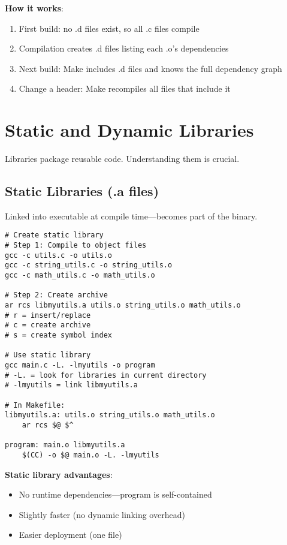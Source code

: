\textbf{How it works}:

\begin{enumerate}
    \item First build: no .d files exist, so all .c files compile
    \item Compilation creates .d files listing each .o's dependencies
    \item Next build: Make includes .d files and knows the full dependency graph
    \item Change a header: Make recompiles all files that include it
\end{enumerate}

\section{Static and Dynamic Libraries}

Libraries package reusable code. Understanding them is crucial.

\subsection{Static Libraries (.a files)}

Linked into executable at compile time—becomes part of the binary.

\begin{lstlisting}
# Create static library
# Step 1: Compile to object files
gcc -c utils.c -o utils.o
gcc -c string_utils.c -o string_utils.o
gcc -c math_utils.c -o math_utils.o

# Step 2: Create archive
ar rcs libmyutils.a utils.o string_utils.o math_utils.o
# r = insert/replace
# c = create archive
# s = create symbol index

# Use static library
gcc main.c -L. -lmyutils -o program
# -L. = look for libraries in current directory
# -lmyutils = link libmyutils.a

# In Makefile:
libmyutils.a: utils.o string_utils.o math_utils.o
	ar rcs $@ $^

program: main.o libmyutils.a
	$(CC) -o $@ main.o -L. -lmyutils
\end{lstlisting}

\textbf{Static library advantages}:
\begin{itemize}
    \item No runtime dependencies—program is self-contained
    \item Slightly faster (no dynamic linking overhead)
    \item Easier deployment (one file)
\end{itemize}

